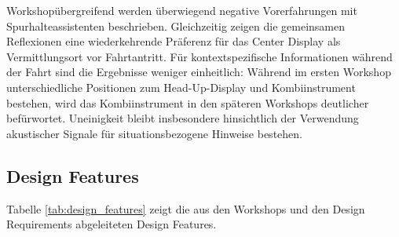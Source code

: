 Workshopübergreifend werden überwiegend negative Vorerfahrungen mit Spurhalteassistenten beschrieben. Gleichzeitig zeigen die gemeinsamen Reflexionen eine wiederkehrende Präferenz für das Center Display als Vermittlungsort vor Fahrtantritt. Für kontextspezifische Informationen während der Fahrt sind die Ergebnisse weniger einheitlich: Während im ersten Workshop unterschiedliche Positionen zum Head-Up-Display und Kombiinstrument bestehen, wird das Kombiinstrument in den späteren Workshops deutlicher befürwortet. Uneinigkeit bleibt insbesondere hinsichtlich der Verwendung akustischer Signale für situationsbezogene Hinweise bestehen.

\subsection{Design Features}
\label{subsec:Ergebnisse_Design_Features}

Tabelle \ref{tab:design_features} zeigt die aus den Workshops und den Design Requirements abgeleiteten Design Features.

